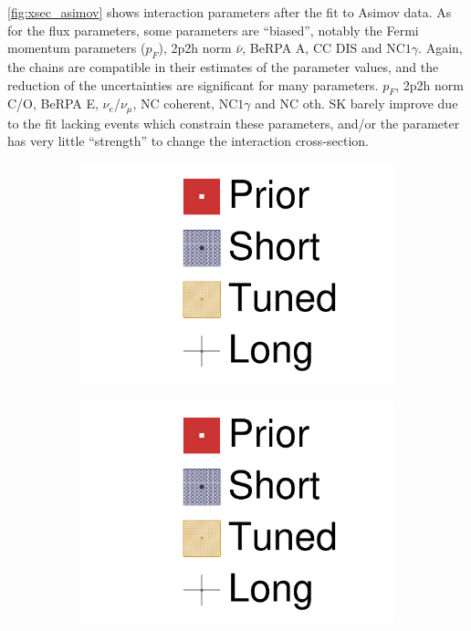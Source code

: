 \autoref{fig:xsec_asimov} shows interaction parameters after the fit to Asimov data. As for the flux parameters, some parameters are ``biased'', notably the Fermi momentum parameters ($p_F$), 2p2h norm $\bar{\nu}$, BeRPA A, CC DIS and NC$1\gamma$. Again, the chains are compatible in their estimates of the parameter values, and the reduction of the uncertainties are significant for many parameters. $p_F$, 2p2h norm C/O, BeRPA E, $\nu_e$/$\nu_\mu$, NC coherent, NC$1\gamma$ and NC oth. SK barely improve due to the fit lacking events which constrain these parameters, and/or the parameter has very little ``strength'' to change the interaction cross-section.
\begin{figure}[h]
	\begin{subfigure}[t]{0.2\textwidth}
		\includegraphics[width=\textwidth, trim={0mm 150mm 50mm 0mm}, clip,page=1]{figures/mach3/Asimov/2017_NewDet_Asimov_actually_0_2017b_NewDet_3Xsec_4Det_5Flux_NewXSecTune_Asimov_0_2017b_NewDet_NewData_Asimov_Long_0}
	\end{subfigure}
	\begin{subfigure}[t]{0.2\textwidth}
		\includegraphics[width=\textwidth, trim={0mm 100mm 50mm 50mm}, clip,page=1]{figures/mach3/Asimov/2017_NewDet_Asimov_actually_0_2017b_NewDet_3Xsec_4Det_5Flux_NewXSecTune_Asimov_0_2017b_NewDet_NewData_Asimov_Long_0}

\end{subfigure}
\end{figure}
